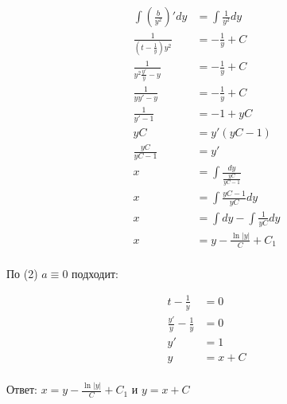 \begin{align*}
    \int \left(\frac{b}{y^2}\right)' dy                                   & = \int \frac{1}{y^2} dy                        \\
    \frac{1}{\left(t - \frac{1}{y}\right)y^2}                             & = -\frac{1}{y} + C                             \\
    \frac{1}{y^2\frac{y'}{y} - y}                                         & = -\frac{1}{y} + C                             \\
    \frac{1}{yy' - y}                                                     & = -\frac{1}{y} + C                             \\
    \frac{1}{y' - 1}                                                      & = -1 + yC                                      \\
    yC                                                                    & = y'(yC - 1)                                   \\
    \frac{yC}{yC - 1}                                                     & = y'                                           \\
    x                                                                     & = \int \frac{dy}{\frac{yC}{yC - 1}}            \\
    x                                                                     & = \int \frac{yC - 1}{yC}dy                     \\
    x                                                                     & = \int dy - \int \frac{1}{yC}dy                \\
    x                                                                     & = y - \frac{\ln|y|}{C} + C_1                   \\
\end{align*}

По (2) $a\equiv0$ подходит:

\begin{align*}
    t - \frac{1}{y}            & = 0     \\
    \frac{y'}{y} - \frac{1}{y} & = 0     \\
    y'                         & = 1     \\
    y                          & = x + C \\
\end{align*}

Ответ: $x = y - \frac{\ln|y|}{C} + C_1$ и $y = x + C$


